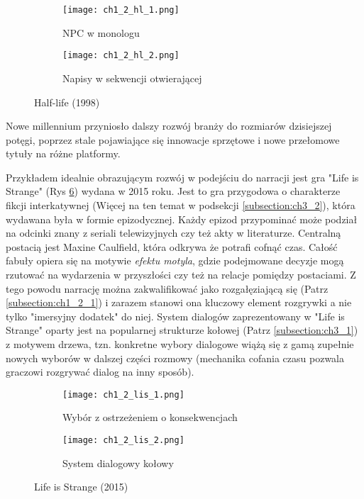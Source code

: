 \begin{figure}[h]
	\begin{subfigure}{0.49\textwidth}
		\caption{NPC w monologu}
		\texttt{[image: ch1\_2\_hl\_1.png]}
		\label{subfig:ch_1_2_hl_1}
	\end{subfigure}
	\begin{subfigure}{0.49\textwidth}
		\caption{Napisy w sekwencji otwierającej}
		\texttt{[image: ch1\_2\_hl\_2.png]}
		\label{subfig:ch_1_2_hl_2}
	\end{subfigure}
	\caption{Half-life (1998)}
	\label{fig:ch1_2_hl}
\end{figure}

\newpage

Nowe millennium przyniosło dalszy rozwój branży do rozmiarów dzisiejszej potęgi, poprzez stale
pojawiające się innowacje sprzętowe i nowe przełomowe tytuły na różne platformy.

Przykładem idealnie obrazującym rozwój w podejściu do narracji jest gra "Life is Strange" (Rys \ref{fig:ch1_2_lis})
wydana w 2015 roku. Jest to gra przygodowa o charakterze fikcji interkatywnej (Więcej na ten temat
w podsekcji \ref{subsection:ch3_2}), która wydawana była w formie epizodycznej. Każdy epizod
przypominać może podział na odcinki znany z seriali telewizyjnych czy też akty w literaturze.
Centralną postacią jest Maxine Caulfield, która odkrywa że potrafi cofnąć czas. Całość fabuły opiera się
na motywie \textit{efektu motyla}, gdzie podejmowane decyzje mogą rzutować na wydarzenia w przyszłości czy
też na relacje pomiędzy postaciami. Z tego powodu narrację można zakwalifikować jako rozgałęziającą się
(Patrz \ref{subsection:ch1_2_1}) i zarazem stanowi ona kluczowy element rozgrywki a nie tylko
"imersyjny dodatek" do niej. System dialogów zaprezentowany w "Life is Strange" oparty jest na popularnej
strukturze kołowej (Patrz \ref{subsection:ch3_1}) z motywem drzewa, tzn. konkretne wybory dialogowe
wiążą się z gamą zupełnie nowych wyborów w dalszej części rozmowy (mechanika cofania czasu pozwala
graczowi rozgrywać dialog na inny sposób).

\begin{figure}[h]
	\begin{subfigure}{0.49\textwidth}
		\caption{Wybór z ostrzeżeniem o konsekwencjach}
		\texttt{[image: ch1\_2\_lis\_1.png]}
		\label{subfig:ch_1_2_lis_1}
	\end{subfigure}
	\begin{subfigure}{0.49\textwidth}
		\caption{System dialogowy kołowy}
		\texttt{[image: ch1\_2\_lis\_2.png]}
		\label{subfig:ch_1_2_lis_2}
	\end{subfigure}
	\caption{Life is Strange (2015)}
	\label{fig:ch1_2_lis}
\end{figure}

